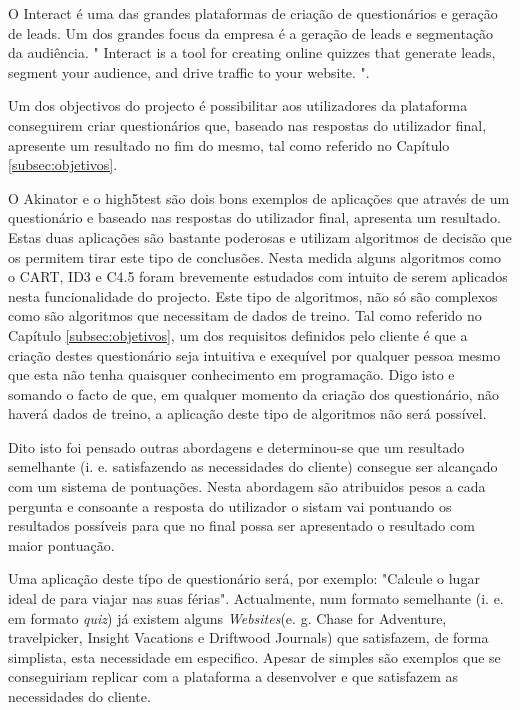 O Interact é uma das grandes plataformas de criação de questionários e geração de leads. Um dos grandes focus da empresa é a geração de leads e segmentação da audiência. " Interact is a tool for creating online quizzes that generate leads, segment your audience, and drive traffic to your website. "\cite{interact}.








Um dos objectivos do projecto é possibilitar aos utilizadores da plataforma conseguirem criar questionários que, baseado nas respostas do utilizador final, apresente um resultado no fim do mesmo, tal como referido no Capítulo \ref{subsec:objetivos}.

O Akinator\cite{akinator} e o high5test\cite{5} são dois bons exemplos de aplicações que através de um questionário e baseado nas respostas do utilizador final, apresenta um resultado. Estas duas aplicações são bastante poderosas e utilizam algoritmos de decisão que os permitem tirar este tipo de conclusões. Nesta medida alguns algoritmos como o CART\cite{cart}, ID3\cite{id3}\cite{id3_2}\cite{cart} e C4.5\cite{cart}\cite{c4.5} foram brevemente estudados com intuito de serem aplicados nesta funcionalidade do projecto. Este tipo de algoritmos, não só são complexos como são algoritmos que necessitam de dados de treino. Tal como referido no Capítulo \ref{subsec:objetivos}, um dos requisitos definidos pelo cliente é que a criação destes questionário seja intuitiva e exequível por qualquer pessoa mesmo que esta não tenha quaisquer conhecimento em programação. Digo isto e somando o facto de que, em qualquer momento da criação dos questionário, não haverá dados de treino, a aplicação deste tipo de algoritmos não será possível.

Dito isto foi pensado outras abordagens e determinou-se que um resultado semelhante (i. e. satisfazendo as necessidades do cliente) consegue ser alcançado com um sistema de pontuações. Nesta abordagem são atribuidos pesos a cada pergunta e consoante a resposta do utilizador o sistam vai pontuando os resultados possíveis para que no final possa ser apresentado o resultado com maior pontuação.

Uma aplicação deste típo de questionário será, por exemplo: "Calcule o lugar ideal de para viajar nas suas férias". Actualmente, num formato semelhante (i. e. em formato \textit{quiz}) já existem alguns \textit{Websites}(e. g. Chase for Adventure\cite{chaseforadventure}, travelpicker\cite{travelpicker}, Insight Vacations\cite{insightvacations} e Driftwood Journals\cite{driftwoodjournals}) que satisfazem, de forma simplista, esta necessidade em especifico. Apesar de simples são exemplos que se conseguiriam replicar com a plataforma a desenvolver e que satisfazem as necessidades do cliente. 

